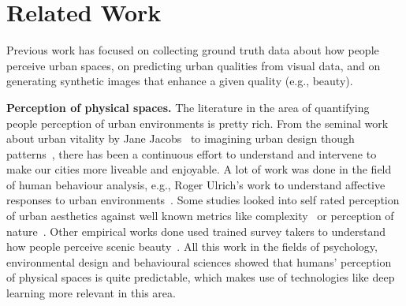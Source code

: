 \section{Related Work}
\label{sec:related}
Previous work has focused on collecting ground truth data about how people perceive urban spaces, on predicting urban qualities from visual data, and on generating synthetic images that enhance a given quality (e.g., beauty). 

\vspace{4pt}\noindent
\textbf{Perception of physical spaces.}
The literature in the area of quantifying people perception of urban environments is pretty rich. From the seminal work about urban vitality by Jane Jacobs~\cite{jacobs1961death} to imagining urban design though patterns~\cite{alexander1977pattern}, there has been a continuous effort to understand and intervene to make our cities more liveable and enjoyable. A lot of work was done in the field of human behaviour analysis, e.g., Roger Ulrich's work to understand affective responses to urban environments~\cite{ulrich1983aesthetic}. Some studies looked into self rated perception of urban aesthetics against well known metrics like complexity~\cite{kaplan1972rated} or perception of nature~\cite{kaplan1989experience}. Other empirical works done used trained survey takers to understand how people perceive scenic beauty~\cite{real2000classification}. All this work in the fields of psychology, environmental design and behavioural sciences showed that humans' perception of physical spaces is quite predictable, which makes use of technologies like deep learning more relevant in this area.

